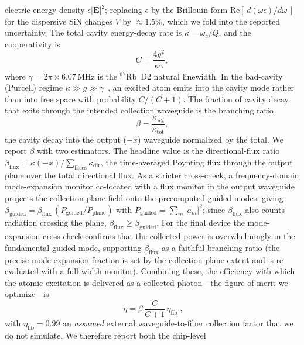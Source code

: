 \documentclass[%
 reprint,
 amsmath,amssymb,
 aps,prx,
 superscriptaddress,
]{revtex4-2}
\newcommand{\unit}[1]{\,\mathrm{#1}}
\begin{document}
electric energy density $\epsilon|\mathbf E|^2$; replacing $\epsilon$ by the
Brillouin form $\mathrm{Re}[\,d(\omega\epsilon)/d\omega\,]$ for the dispersive SiN
changes $V$ by $\approx1.5\%$, which we fold into the reported uncertainty. The
total cavity energy-decay rate is $\kappa = \omega_c/Q$, and the cooperativity is
\begin{equation}
C = \frac{4g^2}{\kappa\gamma},
\label{eq:C}
\end{equation}
where $\gamma = 2\pi\times6.07\unit{MHz}$ is the $^{87}$Rb~D2 natural linewidth.
In the bad-cavity (Purcell) regime $\kappa\gg g\gg\gamma$~\cite{purcell1946}, an
excited atom emits into the cavity mode rather than into free space with
probability $C/(C{+}1)$.
The fraction of cavity decay that exits through the intended collection waveguide
is the branching ratio
\begin{equation}
\beta = \frac{\kappa_\mathrm{wg}}{\kappa_\mathrm{tot}},
\label{eq:beta}
\end{equation}
the cavity decay into the output ($-x$) waveguide normalized by the total. We
report $\beta$ with two estimators. The headline value is the directional-flux
ratio $\beta_\mathrm{flux}=\kappa(-x)/\sum_\mathrm{faces}\kappa_\mathrm{dir}$, the
time-averaged Poynting flux through the output plane over the total directional
flux. As a stricter cross-check, a frequency-domain mode-expansion monitor
co-located with a flux monitor in the output waveguide projects the
collection-plane field onto the precomputed guided modes, giving
$\beta_\mathrm{guided}=\beta_\mathrm{flux}\,(P_\mathrm{guided}/P_\mathrm{plane})$
with $P_\mathrm{guided}=\sum_m|a_m|^2$; since $\beta_\mathrm{flux}$ also counts
radiation crossing the plane, $\beta_\mathrm{flux}\ge\beta_\mathrm{guided}$. For
the final device the mode-expansion cross-check confirms that the collected power
is overwhelmingly in the fundamental guided mode, supporting $\beta_\mathrm{flux}$
as a faithful branching ratio (the precise mode-expansion fraction is set by the
collection-plane extent and is re-evaluated with a full-width monitor). Combining
these, the efficiency with
which the atomic excitation is delivered as a collected photon---the figure of
merit we optimize---is
\begin{equation}
\boxed{\;\eta = \beta\,\frac{C}{C+1}\,\eta_\mathrm{fib}\;,}
\label{eq:eta}
\end{equation}
with $\eta_\mathrm{fib}=0.99$ an \emph{assumed} external waveguide-to-fiber
collection factor that we do not simulate. We therefore report both the chip-level
\end{document}
